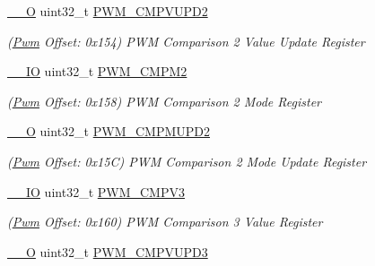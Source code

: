 \begin{DoxyCompactItemize}
\mbox{\hyperlink{core__cm7_8h_a7e25d9380f9ef903923964322e71f2f6}{\+\_\+\+\_\+O}} uint32\+\_\+t \mbox{\hyperlink{structPwm_ae6366058a6fd65aeae1a2bfd9d971c06}{P\+W\+M\+\_\+\+C\+M\+P\+V\+U\+P\+D2}}
\begin{DoxyCompactList}\small\item\em (\mbox{\hyperlink{structPwm}{Pwm}} Offset\+: 0x154) P\+WM Comparison 2 Value Update Register \end{DoxyCompactList}\item 
\mbox{\label{structPwm_afe3a2e7f7191b802a3854e79027ce4fc}} 
\mbox{\hyperlink{core__cm7_8h_aec43007d9998a0a0e01faede4133d6be}{\+\_\+\+\_\+\+IO}} uint32\+\_\+t \mbox{\hyperlink{structPwm_afe3a2e7f7191b802a3854e79027ce4fc}{P\+W\+M\+\_\+\+C\+M\+P\+M2}}
\begin{DoxyCompactList}\small\item\em (\mbox{\hyperlink{structPwm}{Pwm}} Offset\+: 0x158) P\+WM Comparison 2 Mode Register \end{DoxyCompactList}\item 
\mbox{\label{structPwm_aaaf922282f4f056784aeb442ece99851}} 
\mbox{\hyperlink{core__cm7_8h_a7e25d9380f9ef903923964322e71f2f6}{\+\_\+\+\_\+O}} uint32\+\_\+t \mbox{\hyperlink{structPwm_aaaf922282f4f056784aeb442ece99851}{P\+W\+M\+\_\+\+C\+M\+P\+M\+U\+P\+D2}}
\begin{DoxyCompactList}\small\item\em (\mbox{\hyperlink{structPwm}{Pwm}} Offset\+: 0x15C) P\+WM Comparison 2 Mode Update Register \end{DoxyCompactList}\item 
\mbox{\label{structPwm_af460355d7324b67527271d6cca59cd94}} 
\mbox{\hyperlink{core__cm7_8h_aec43007d9998a0a0e01faede4133d6be}{\+\_\+\+\_\+\+IO}} uint32\+\_\+t \mbox{\hyperlink{structPwm_af460355d7324b67527271d6cca59cd94}{P\+W\+M\+\_\+\+C\+M\+P\+V3}}
\begin{DoxyCompactList}\small\item\em (\mbox{\hyperlink{structPwm}{Pwm}} Offset\+: 0x160) P\+WM Comparison 3 Value Register \end{DoxyCompactList}\item 
\mbox{\label{structPwm_a7df0446ba9416fee482a1678d5248275}} 
\mbox{\hyperlink{core__cm7_8h_a7e25d9380f9ef903923964322e71f2f6}{\+\_\+\+\_\+O}} uint32\+\_\+t \mbox{\hyperlink{structPwm_a7df0446ba9416fee482a1678d5248275}{P\+W\+M\+\_\+\+C\+M\+P\+V\+U\+P\+D3}}

\end{DoxyCompactItemize}
